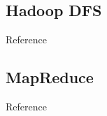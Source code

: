 \subsection{Hadoop DFS}

Reference \cite{ghemawat2003google, shvachko2010hadoop}

\subsection{MapReduce}

Reference \cite{dean2008mapreduce}